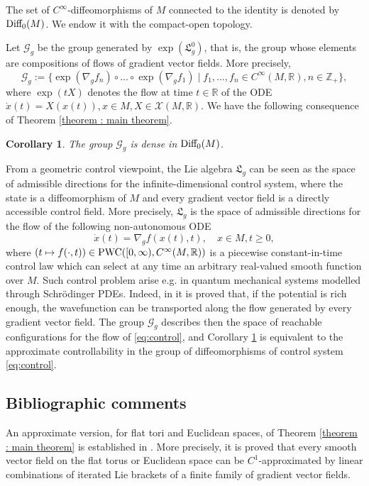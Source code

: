 \documentclass[10pt]{article}
\newcommand{\R}{{\mathbb R}}
\newcommand{\Z}{{\mathbb Z}}
\newcommand{\Chi}{{\mathcal X}}
\newcommand{\LL}{{\mathfrak L}}
\newtheorem{cor}{Corollary}
\begin{document}
The set of $C^\infty$-diffeomorphisms of $M$ connected to the identity is denoted by ${\rm Diff_0}(M)$. We endow it with the compact-open topology.

Let $\mathcal{G}_g$ be the group generated by $\exp(\LL_g^0)$, that is, the group whose elements are compositions of flows of gradient vector fields. More precisely,
$$\mathcal{G}_g:=\{\exp(\nabla_g f_n)\circ\dots\circ \exp(\nabla_g f_1)\mid f_1,\dots,f_n\in C^\infty(M,\R), n\in \Z_+\},$$
where $\exp(t X)$ denotes the flow at time $t\in \R$ of the ODE $\dot{x}(t)=X(x(t)), x\in M, X\in \Chi(M,\R)$. We have the following consequence of Theorem \ref{theorem : main theorem}.
\begin{cor}\label{cor : main corollary}
The group $\mathcal{G}_g$ is dense in ${\rm Diff_0}(M)$.
\end{cor}
From a geometric control viewpoint, the Lie algebra $\LL_g$ can be seen as the space of admissible directions for the infinite-dimensional control system, where the state is a diffeomorphism of $M$ and every gradient vector field is a directly accessible control field. More precisely, $\LL_g$ is the space of admissible directions for the flow of the following non-autonomous ODE
\begin{equation}\label{eq:control}
\dot{x}(t)=\nabla_g f(x(t),t), \quad x\in M, t\geq 0,
\end{equation}
where $(t\mapsto f(\cdot,t))\in {\rm PWC}([0,\infty), C^\infty(M,\R))$ is a piecewise constant-in-time control law which can select at any time an arbitrary real-valued smooth function over $M$. Such control problem arise e.g. in quantum mechanical systems modelled through Schrödinger PDEs. Indeed, in \cite{beauchard-pozzoli2} it is proved that, if the potential is rich enough, the wavefunction can be transported along the flow generated by every gradient vector field. The group $\mathcal{G}_g$ describes then the space of reachable configurations for the flow of \eqref{eq:control}, and Corollary \ref{cor : main corollary} is equivalent to the approximate controllability in the group of diffeomorphisms of control system \eqref{eq:control}. 


\subsection{Bibliographic comments}
An approximate version, for flat tori and Euclidean spaces, of Theorem \ref{theorem : main theorem} is established in \cite[Propositions 31 \& 32]{beauchard-pozzoli2}. More precisely, it is proved that every smooth vector field on the flat torus or Euclidean space can be $C^1$-approximated by linear combinations of iterated Lie brackets of a finite family of gradient vector fields.
\end{document}
